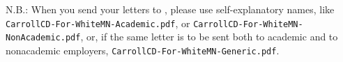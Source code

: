 \documentclass{econtex}
\begin{document}
N.B.:  When you send your letters to \JMStaffEmail, please use self-explanatory names, like
\texttt{CarrollCD-For-WhiteMN-Academic.pdf}, or
\texttt{CarrollCD-For-WhiteMN-NonAcademic.pdf}, or, if the same letter
is to be sent both to academic and to nonacademic employers,
\texttt{CarrollCD-For-WhiteMN-Generic.pdf}.
\end{document}
